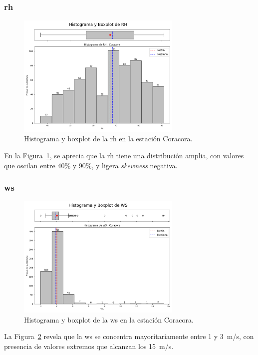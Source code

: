 \subsubsection*{\gls{rh} }
\begin{figure}[htbp]
\centering
\includegraphics[width=0.7\textwidth]{resultados/por_estacion_meteorologica/Coracora/RH_histograma.png}
\caption{Histograma y boxplot de la \gls{rh}  en la estación Coracora.}
\label{fig:coracora_RH}
\end{figure}
En la Figura~\ref{fig:coracora_RH}, se aprecia que la \gls{rh} tiene una distribución amplia, con valores que oscilan entre 40\% y 90\%, y ligera \textit{skewness} negativa.


\subsubsection*{\gls{ws} }
\begin{figure}[htbp]
\centering
\includegraphics[width=0.7\textwidth]{resultados/por_estacion_meteorologica/Coracora/WS_histograma.png}
\caption{Histograma y boxplot de la \gls{ws}  en la estación Coracora.}
\label{fig:coracora_WS}
\end{figure}
La Figura~\ref{fig:coracora_WS} revela que la \gls{ws} se concentra mayoritariamente entre 1 y 3~m/s, con presencia de valores extremos que alcanzan los 15~m/s.


